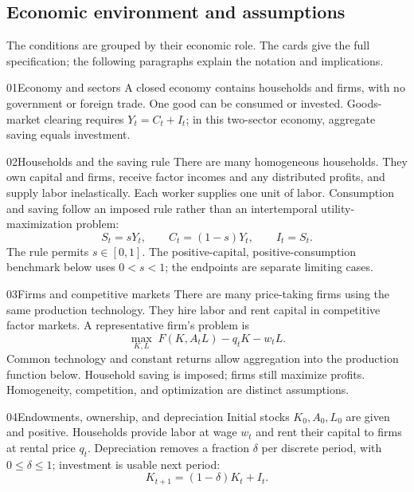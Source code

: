 \subsection{Economic environment and assumptions}\label{economic-environment-and-specific-assumptions}

The conditions are grouped by their economic role. The cards give the full
specification; the following paragraphs explain the notation and implications.

\begin{modelsetup}[1]
\begin{modelcondition}{01}{Economy and sectors}
A closed economy contains households and firms, with no government or foreign
trade. One good can be consumed or invested. Goods-market clearing requires
$Y_t=C_t+I_t$; in this two-sector economy, aggregate saving equals investment.
\end{modelcondition}
\begin{modelcondition}{02}{Households and the saving rule}
There are many homogeneous households. They own capital and firms, receive
factor incomes and any distributed profits, and supply labor inelastically.
Each worker supplies one unit of labor. Consumption and saving follow an
imposed rule rather than an intertemporal utility-maximization problem:
\[
S_t=sY_t,\qquad C_t=(1-s)Y_t,\qquad I_t=S_t.
\]
The rule permits $s\in[0,1]$. The positive-capital, positive-consumption
benchmark below uses $0<s<1$; the endpoints are separate limiting cases.
\end{modelcondition}
\begin{modelcondition}{03}{Firms and competitive markets}
There are many price-taking firms using the same production technology.
They hire labor and rent capital in competitive factor markets. A
representative firm's problem is
\[
\max_{K,L}\;F(K,A_tL)-q_tK-w_tL.
\]
Common technology and constant returns allow aggregation into the production
function below. Household saving is imposed; firms still maximize profits.
Homogeneity, competition, and optimization are distinct assumptions.
\end{modelcondition}
\begin{modelcondition}{04}{Endowments, ownership, and depreciation}
Initial stocks $K_0,A_0,L_0$ are given and positive. Households provide labor
at wage $w_t$ and rent their capital to firms at rental price $q_t$.
Depreciation removes a fraction $\delta$ per discrete period, with
$0\leq\delta\leq1$; investment is usable next period:
\[
K_{t+1}=(1-\delta)K_t+I_t.
\]
\end{modelcondition}
\end{modelsetup}
